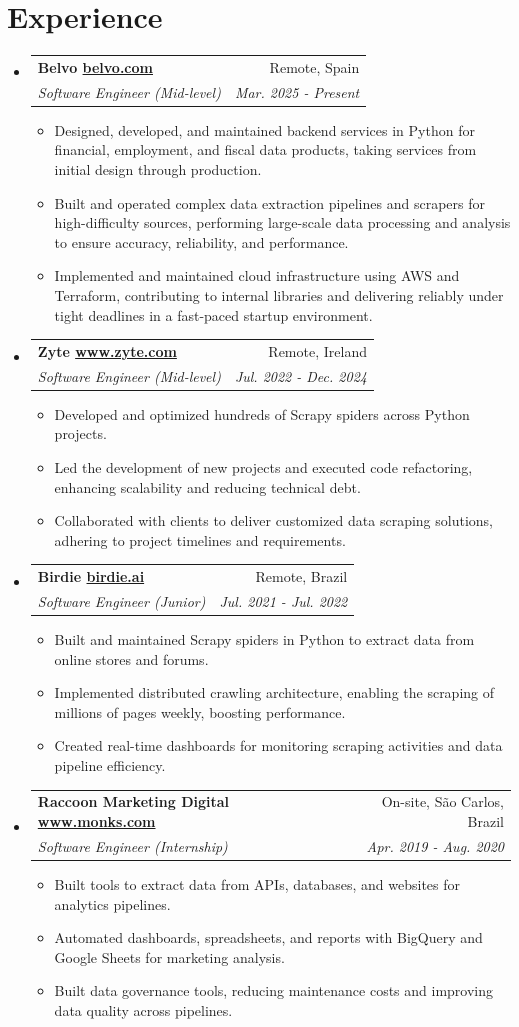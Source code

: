 \documentclass[letterpaper,11pt]{article}
\makeatletter
\newcommand{\resumeItemNoTitle}[1]{
    \item\small{
        {#1 \vspace{-2pt}}
    }
}
\newcommand{\resumeSubheading}[4]{
  \vspace{-1pt}\item
    \begin{tabular*}{0.97\textwidth}[t]{l@{\extracolsep{\fill}}r}
      \textbf{#1} & #2 \\
      \textit{\small#3} & \textit{\small #4} \\
    \end{tabular*}\vspace{-5pt}
}
\newcommand{\resumeSubHeadingListStart}{\begin{itemize}[leftmargin=*]}
\newcommand{\resumeSubHeadingListEnd}{\end{itemize}}
\newcommand{\resumeItemListStart}{\begin{itemize}[leftmargin=*]\setlength\itemsep{1mm}}
\newcommand{\resumeItemListEnd}{\end{itemize}\vspace{-5pt}}
\makeatother
\begin{document}
\section{Experience}
  \resumeSubHeadingListStart
  \resumeSubheading
      {Belvo \href{https://belvo.com/}{belvo.com}}{Remote, Spain}
      {Software Engineer (Mid-level)}{Mar. 2025 - Present}
      \resumeItemListStart
        \resumeItemNoTitle
            {Designed, developed, and maintained backend services in Python for financial, employment, and fiscal data products, taking services from initial design through production.}
        \resumeItemNoTitle
            {Built and operated complex data extraction pipelines and scrapers for high-difficulty sources, performing large-scale data processing and analysis to ensure accuracy, reliability, and performance.}
        \resumeItemNoTitle
            {Implemented and maintained cloud infrastructure using AWS and Terraform, contributing to internal libraries and delivering reliably under tight deadlines in a fast-paced startup environment.}
      \resumeItemListEnd
  \resumeSubheading
      {Zyte \href{https://www.zyte.com/}{www.zyte.com}}{Remote, Ireland}
      {Software Engineer (Mid-level)}{Jul. 2022 - Dec. 2024}
      \resumeItemListStart
        \resumeItemNoTitle
            {Developed and optimized hundreds of Scrapy spiders across Python projects.}
        \resumeItemNoTitle
            {Led the development of new projects and executed code refactoring, enhancing scalability and reducing technical debt.}
        \resumeItemNoTitle
            {Collaborated with clients to deliver customized data scraping solutions, adhering to project timelines and requirements.}
      \resumeItemListEnd
  \resumeSubheading
      {Birdie \href{https://birdie.ai/}{birdie.ai}}{Remote, Brazil}
      {Software Engineer (Junior)}{Jul. 2021 - Jul. 2022}
      \resumeItemListStart
        \resumeItemNoTitle
            {Built and maintained Scrapy spiders in Python to extract data from online stores and forums.}
        \resumeItemNoTitle
            {Implemented distributed crawling architecture, enabling the scraping of millions of pages weekly, boosting performance.}
        \resumeItemNoTitle
            {Created real-time dashboards for monitoring scraping activities and data pipeline efficiency.}
      \resumeItemListEnd
  \resumeSubheading
      {Raccoon Marketing Digital \href{https://www.monks.com/}{www.monks.com}}{On-site, São Carlos, Brazil}
      {Software Engineer (Internship)}{Apr. 2019 - Aug. 2020}
      \resumeItemListStart
        \resumeItemNoTitle
            {Built tools to extract data from APIs, databases, and websites for analytics pipelines.}
        \resumeItemNoTitle
            {Automated dashboards, spreadsheets, and reports with BigQuery and Google Sheets for marketing analysis.}
        \resumeItemNoTitle
            {Built data governance tools, reducing maintenance costs and improving data quality across pipelines.}
      \resumeItemListEnd
  \resumeSubHeadingListEnd
  
\end{document}
